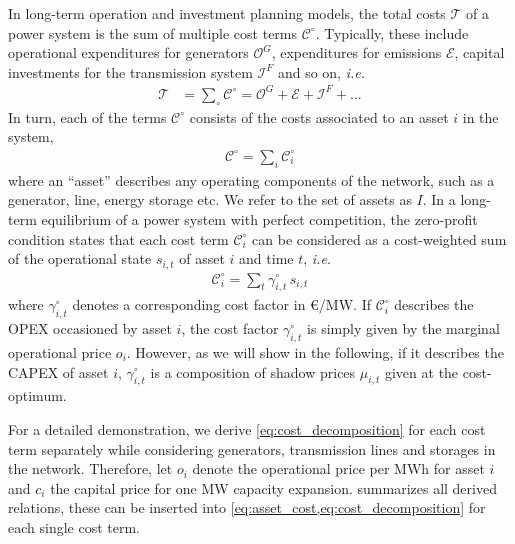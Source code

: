 \documentclass[11pt,twocolumn]{article}
\newcommand{\ie}{\textit{i.e.} }
\newcommand{\state}{s_{i,t}}
\newcommand{\costfactor}{\gamma^\circ_{i,t}}
\newcommand{\totalcost}{\mathcal{T}}
\newcommand{\cost}[1][\circ]{\mathcal{C}^{#1}}
\newcommand{\opexgeneration}{\mathcal{O}^G}
\newcommand{\capexflow}{\mathcal{I}^F}
\newcommand{\emissioncost}{\mathcal{E}}
\begin{document}
In long-term operation and investment planning models, the total costs $\totalcost$ of a power system is the sum of multiple cost terms $\cost$. Typically, these include operational expenditures for generators $\opexgeneration$, expenditures for emissions $\emissioncost$,  capital investments for the transmission system $\capexflow$ and so on, \ie
\begin{align}
\totalcost &= \sum_\circ \cost = \opexgeneration + \emissioncost +  \capexflow + ...
\label{eq:total_cost}
\end{align}
In turn, each of the terms $\cost$ consists of the costs associated to an asset $i$ in the system, 
\begin{align}
    \cost = \sum_{i} \cost_{i}
    \label{eq:asset_cost}
\end{align} 
where an ``asset'' describes any operating components of the network, such as a generator, line, energy storage etc. We refer to the set of assets as $I$. 
In a long-term equilibrium of a power system with perfect competition, the zero-profit condition states that each cost term $\cost_{i}$ can be considered as a cost-weighted sum of the operational state $s_{i,t}$ of asset $i$ and time $t$, \ie
\begin{align}
    \cost_{i} = \sum_t  \costfactor \, \state
    \label{eq:cost_decomposition}
\end{align}
where $\costfactor$ denotes a corresponding cost factor in \euro/MW. 
If $\cost_i$ describes the OPEX occasioned by asset $i$, the cost factor $\costfactor$ is simply given by the marginal operational price $o_i$. However, as we will show in the following, if it describes the CAPEX of asset $i$, $\costfactor$ is a composition of shadow prices $\mu_{i,t}$ given at the cost-optimum. 

For a detailed demonstration, we derive  \cref{eq:cost_decomposition} for each cost term separately while considering generators, transmission lines and storages in the network. Therefore, let $o_i$ denote the operational price per MWh for asset $i$ and $c_i$ the capital price for one MW capacity expansion.  summarizes all derived relations, these can be inserted into \cref{eq:asset_cost,eq:cost_decomposition} for each single cost term.
\end{document}
